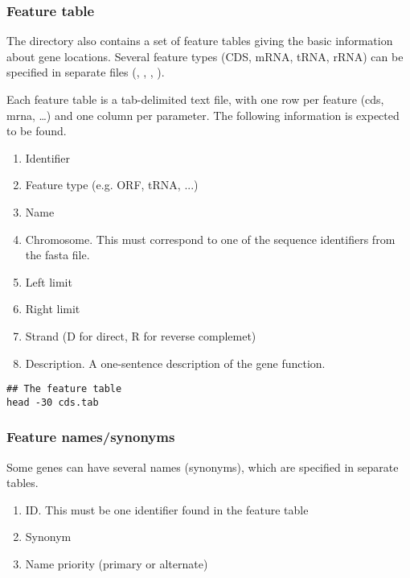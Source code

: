 \subsubsection{Feature table}

The  directory also contains a set of feature tables
giving the basic information about gene locations. Several feature
types (CDS, mRNA, tRNA, rRNA) can be specified in separate files
(, , , ).

Each feature table is a tab-delimited text file, with one row per
feature (cds, mrna, \ldots) and one column per parameter. The
following information is expected to be found.

\begin{enumerate}

\item Identifier

\item Feature type (e.g. ORF, tRNA, ...)

\item Name

\item Chromosome. This must correspond to one of the sequence
identifiers from the fasta file.

\item Left limit

\item Right limit

\item Strand (D for direct, R for reverse complemet)

\item Description. A one-sentence description of the gene function.

\end{enumerate}


\begin{footnotesize}
\begin{verbatim}
## The feature table
head -30 cds.tab
\end{verbatim}
\end{footnotesize}


\subsubsection{Feature names/synonyms}

Some genes can have several names (synonyms), which are specified in
separate tables.

\begin{enumerate}
\item ID. This must be one identifier found in the feature table
\item Synonym
\item Name priority (primary or alternate)
\end{enumerate}



